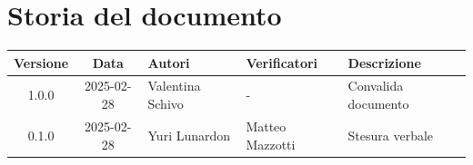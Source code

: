 \section*{Storia del documento}
\begin{tabularx}{\textwidth}{ c c p{2.75cm} p{2.75cm} X }
    \rowcolor{gray!20}\rule{0pt}{0.5cm}\textbf{Versione} & \textbf{Data} & \textbf{Autori} & \textbf{Verificatori} & \textbf{Descrizione} \\[0.7ex]
    \hline
    \rule{0pt}{0.5cm}1.0.0 & 2025-02-28 & Valentina Schivo & - & Convalida documento\\[0.7ex]
    \hline
    \rule{0pt}{0.5cm}0.1.0 & 2025-02-28 & Yuri Lunardon & Matteo Mazzotti & Stesura verbale\\[0.7ex]
\end{tabularx} 